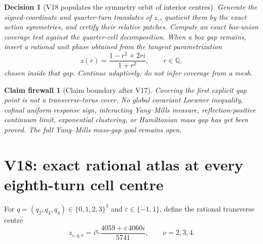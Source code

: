 \documentclass[11pt,oneside]{article}
\newtheorem{firewall}[theorem]{Claim firewall}
\newtheorem{decision}[theorem]{Decision}
\theoremstyle{definition}
\theoremstyle{remark}
\begin{document}
\begin{decision}[V18 populates the symmetry orbit of interior centres]
\label{dec:newv17-next}
Generate the signed-coordinate and quarter-turn translates of
\(z_\circ\), quotient them by the exact action symmetries, and certify
their relative patches.  Compute an exact box-union coverage test
against the quarter-cell decomposition.  When a box gap remains,
insert a rational unit phase obtained from the tangent
parametrization
\[
 z(r)=\frac{1-r^2+2ri}{1+r^2},\qquad r\in\mathbb Q,       \tag{17.10}
\]
chosen inside that gap.  Continue adaptively; do not infer coverage
from a mesh.
\end{decision}

\begin{firewall}[Claim boundary after V17]
\label{fire:newv17-final}
Covering the first explicit gap point is not a transverse-torus
cover.  No global covariant Loewner inequality, cofinal uniform
response sign, interacting Yang--Mills measure, reflection-positive
continuum limit, exponential clustering, or Hamiltonian mass gap has
yet been proved.  The full Yang--Mills mass-gap goal remains open.
\end{firewall}

\section{V18: exact rational atlas at every eighth-turn cell centre}
\label{sec:newv18-eighth-atlas}

For \(q=(q_2,q_3,q_4)\in\{0,1,2,3\}^3\) and
\(\varepsilon\in\{-1,1\}\), define the rational transverse centre
\[
 z_{\varepsilon,q,\nu}=i^{q_\nu}
 \frac{4059+\varepsilon\,4060i}{5741},
 \qquad \nu=2,3,4.                                       \tag{18.1}
\]
\end{document}
